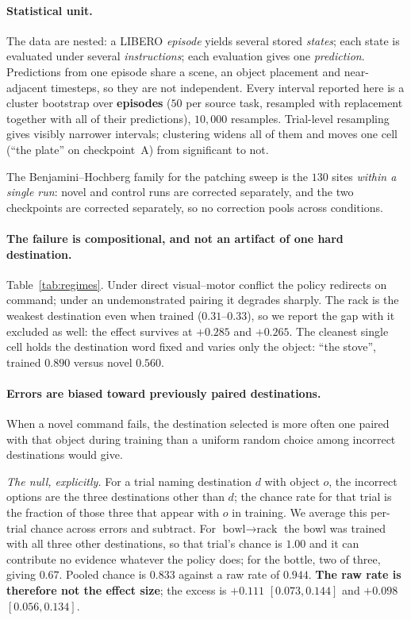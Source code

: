 \documentclass{article}
\begin{document}
\paragraph{Statistical unit.} The data are nested: a LIBERO \emph{episode} yields several
stored \emph{states}; each state is evaluated under several \emph{instructions}; each
evaluation gives one \emph{prediction}. Predictions from one episode share a scene, an object
placement and near-adjacent timesteps, so they are not independent. Every interval reported
here is a cluster bootstrap over \textbf{episodes} ($50$ per source task, resampled with
replacement together with all of their predictions), $10{,}000$ resamples. Trial-level
resampling gives visibly narrower intervals; clustering widens all of them and moves one cell
(``the plate'' on checkpoint~A) from significant to not.

The Benjamini--Hochberg family for the patching sweep is the $130$ sites \emph{within a single
run}: novel and control runs are corrected separately, and the two checkpoints are corrected
separately, so no correction pools across conditions.

\paragraph{The failure is compositional, and not an artifact of one hard destination.}
Table~\ref{tab:regimes}. Under direct visual--motor conflict the policy redirects on command;
under an undemonstrated pairing it degrades sharply. The rack is the weakest destination even
when trained ($0.31$--$0.33$), so we report the gap with it excluded as well: the effect
survives at $+0.285$ and $+0.265$. The cleanest single cell holds the destination word fixed
and varies only the object: ``the stove'', trained $0.890$ versus novel $0.560$.

\paragraph{Errors are biased toward previously paired destinations.} When a novel command
fails, the destination selected is more often one paired with that object during training than
a uniform random choice among incorrect destinations would give.

\emph{The null, explicitly.} For a trial naming destination $d$ with object $o$, the incorrect
options are the three destinations other than $d$; the chance rate for that trial is the
fraction of those three that appear with $o$ in training. We average this per-trial chance
across errors and subtract. For $\textrm{bowl} \to \textrm{rack}$ the bowl was trained with all
three other destinations, so that trial's chance is $1.00$ and it can contribute no evidence
whatever the policy does; for the bottle, two of three, giving $0.67$. Pooled chance is
$0.833$ against a raw rate of $0.944$. \textbf{The raw rate is therefore not the effect size};
the excess is $+0.111$ $[0.073, 0.144]$ and $+0.098$ $[0.056, 0.134]$.
\end{document}
